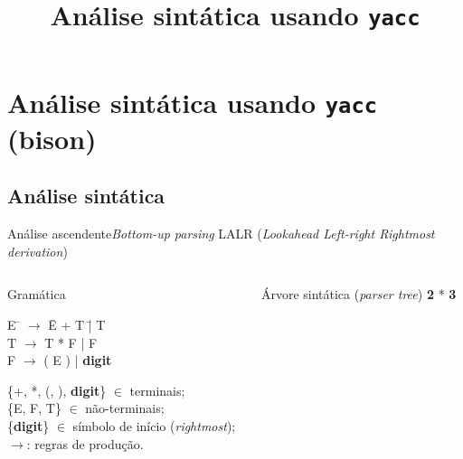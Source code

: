 
\title{Análise sintática usando {\tt yacc}}
\section{Análise sintática usando {\tt yacc} (bison)}

\frame{\maketitle}

\frame{\tableofcontents}

\subsection{Análise sintática}

\begin{frame}{Análise ascendente}{{\em Bottom-up parsing}}
  LALR ({\it Lookahead Left-right Rightmost derivation\/})

  \begin{columns}
     \begin{column}{.5\textwidth}
      \begin{block}{Gramática}
        \begin{tabbing}
          E \= $\rightarrow$ \= E + T \= | T \\
          T \> $\rightarrow$ \> T * F \> | F\\
          F \> $\rightarrow$ \> ( E ) \> | {\bf digit}\\
        \end{tabbing}
        \{+, *, (, ), {\bf digit}\} $\in$ terminais;\\
        \{E, F, T\} $\in$ não-terminais;\\
        \{{\bf digit}\} $\in$ símbolo de início ({\it rightmost\/});\\
        $\rightarrow$: regras de produção.
      \end{block}
    \end{column}
    \pause
    \begin{column}{.5\textwidth}
      \begin{block}{Árvore sintática ({\it parser tree\/})}
        {\bf 2} * {\bf 3}\\ 
        \small
    \end{block}
    \end{column}
  \end{columns}
\end{frame}

